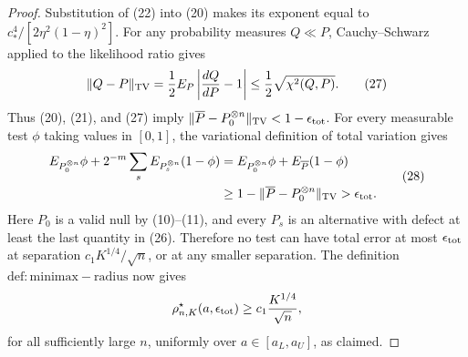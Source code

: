 \documentclass{article}
\begin{document}
\begin{proof}
Substitution of (22) into (20) makes its exponent equal to \(c_*^4/[2\eta^2(1-\eta)^2]\).  For any probability measures \(Q\ll P\), Cauchy--Schwarz applied to the likelihood ratio gives
\[
 \|Q-P\|_{\rm TV}
 =\frac12E_P\left|\frac{dQ}{dP}-1\right|
 \leq\frac12\sqrt{\chi^2(Q,P)}.
 \tag{27}
\]
Thus (20), (21), and (27) imply
\(\|\overline P-P_0^{\otimes n}\|_{\rm TV}<1-\epsilon_{\rm tot}\).  For every measurable test \(\phi\) taking values in \([0,1]\), the variational definition of total variation gives
\[
 \begin{aligned}
 E_{P_0^{\otimes n}}\phi
 +2^{-m}\sum_sE_{P_s^{\otimes n}}(1-\phi)
 &=E_{P_0^{\otimes n}}\phi+E_{\overline P}(1-\phi) \\
 &\geq1-\|\overline P-P_0^{\otimes n}\|_{\rm TV}
 >\epsilon_{\rm tot}.
 \end{aligned}
 \tag{28}
\]
Here \(P_0\) is a valid null by (10)--(11), and every \(P_s\) is an alternative with defect at least the last quantity in (26).  Therefore no test can have total error at most \(\epsilon_{\rm tot}\) at separation \(c_1K^{1/4}/\sqrt n\), or at any smaller separation.  The definition \(\mathrm{def:minimax-radius}\) now gives
\[
 \rho^\star_{n,K}(a,\epsilon_{\rm tot})
 \geq c_1\frac{K^{1/4}}{\sqrt n},
\]
for all sufficiently large \(n\), uniformly over \(a\in[a_L,a_U]\), as claimed.
\end{proof}
\end{document}
